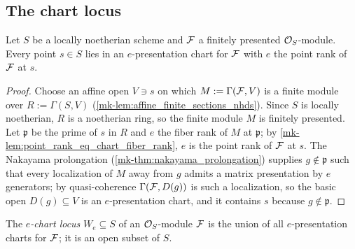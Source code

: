 \subsection{The chart locus}

\begin{theorem}
  \label{mk-thm:presentation_chart_exists}
  \leanok

  Let \(S\) be a locally noetherian scheme and \(\mathcal{F}\) a finitely presented
  \(\mathcal{O}_S\)-module.  Every point \(s \in S\) lies in an \(e\)-presentation
  chart for \(\mathcal{F}\) with \(e\) the point rank of \(\mathcal{F}\) at \(s\).
\end{theorem}

\begin{proof}
  \leanok
  Choose an affine open \(V \ni s\) on which \(M := \Gamma(\mathcal{F}, V)\) is a
  finite module over \(R := \Gamma(S, V)\)
  (\ref{mk-lem:affine_finite_sections_nhds}).  Since \(S\) is locally
  noetherian, \(R\) is a noetherian ring, so the finite module \(M\) is
  finitely presented.  Let \(\mathfrak p\) be the prime of \(s\) in \(R\)
  and \(e\) the fiber rank of \(M\) at \(\mathfrak p\); by
  \ref{mk-lem:point_rank_eq_chart_fiber_rank}, \(e\) is the point rank of
  \(\mathcal{F}\) at \(s\).  The Nakayama prolongation
  (\ref{mk-thm:nakayama_prolongation}) supplies \(g \notin \mathfrak p\) such
  that every localization of \(M\) away from \(g\) admits a matrix
  presentation by \(e\) generators; by quasi-coherence
  \(\Gamma(\mathcal{F}, D(g))\) is such a localization, so the basic open
  \(D(g) \subseteq V\) is an \(e\)-presentation chart, and it contains
  \(s\) because \(g \notin \mathfrak p\).
\end{proof}

\begin{definition}
  \label{mk-def:chart_locus}
  \leanok

  The \emph{\(e\)-chart locus} \(W_e \subseteq S\) of an \(\mathcal{O}_S\)-module
  \(\mathcal{F}\) is the union of all \(e\)-presentation charts for \(\mathcal{F}\); it is an
  open subset of \(S\).
\end{definition}

